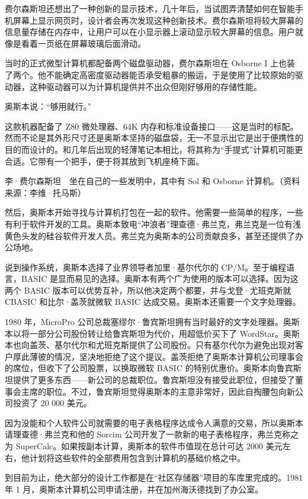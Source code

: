 \documentclass[12pt,UTF8]{ctexbook}
\begin{document}
费尔森斯坦还想出了一种创新的显示技术，几十年后，当试图弄清楚如何在智能手机屏幕上显示网页时，设计者会再次发现这种创新技术。费尔森斯坦将较大屏幕的信息量存储在内存中，让用户可以在小显示器上滚动显示较大屏幕的信息。用户就像是看着一页纸在屏幕玻璃后面滑动。

当时的正式微型计算机都配备两个磁盘驱动器，费尔森斯坦在 Osborne I 上也装了两个。他不能确定高密度驱动器能否承受粗暴的搬运，于是使用了比较原始的驱动器，这种驱动器可以为计算机提供并不出众但刚好够用的存储性能。

奥斯本说：“够用就行。”

这款机器配备了 Z80 微处理器、64K 内存和标准设备接口——这是当时的标配。然而不论是其外形尺寸还是奥斯本坚持的磁盘袋，无一不显示出它是出于便携性的目的而设计的。和几年后出现的轻薄笔记本相比，将其称为“手提式”计算机可能更合适。它带有一个把手，便于将其放到飞机座椅下面。



李·费尔森斯坦　坐在自己的一些发明中，其中有 Sol 和 Osborne 计算机。（资料来源：李维·托马斯）

然后，奥斯本开始寻找与计算机打包在一起的软件。他需要一些简单的程序，一些有利于软件开发的工具。奥斯本致电“冲浪者”理查德·弗兰克，弗兰克是一位有浅黄色头发的硅谷软件开发人员。弗兰克为奥斯本的公司贡献良多，甚至还提供了办公场地。

说到操作系统，奥斯本选择了业界领导者加里·基尔代尔的 CP/M。至于编程语言，BASIC 是显而易见的选择。奥斯本有两个广为使用的版本可以选择。因为这两个 BASIC 版本可以优势互补，所以他决定两个都要，并与戈登·尤班克斯就 CBASIC 和比尔·盖茨就微软 BASIC 达成交易。奥斯本还需要一个文字处理器。

1980 年，MicroPro 公司总裁塞缪尔·鲁宾斯坦拥有当时最好的文字处理器。奥斯本以将一部分公司股份转让给鲁宾斯坦为代价，用超低价买下了 WordStar。奥斯本也向盖茨、基尔代尔和尤班克斯提供了公司股份。只有基尔代尔为避免出现对客户厚此薄彼的情况，坚决地拒绝了这个提议。盖茨拒绝了奥斯本计算机公司理事会的席位，但收下了公司股票，以换取微软 BASIC 的特别优惠价。奥斯本向鲁宾斯坦提供了更多东西——新公司的总裁职位。鲁宾斯坦没有接受此职位，但接受了董事会主席的职位。不过，鲁宾斯坦觉得奥斯本的主意非常好，因此自掏腰包向新公司投资了 20 000 美元。

因为没能和个人软件公司就需要的电子表格程序达成令人满意的交易，所以奥斯本请理查德·弗兰克和他的 Sorcim 公司开发了一款新的电子表格程序，弗兰克称之为 SuperCalc。如果按副本计算，奥斯本的软件市值现在总计可达 2000 美元左右，他计划将这些软件的全部费用包含到计算机的基础价格之中。

到目前为止，绝大部分的设计工作都是在“社区存储器”项目的车库里完成的。1981 年 1 月，奥斯本计算机公司申请注册，并在加州海沃德找到了办公室。
\end{document}
